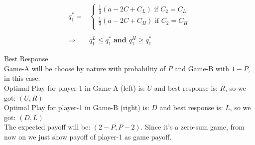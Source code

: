 \documentclass[
  course = {{IE579 Game Theory and Multi-Agent Reinforcement Learning}},
  quartile = {{4}},
  assignment = 2,
  name = {{Mohammad Mahdi Rahimi}},
  studentnumber = {{20208244}},
  email = {{mahi@kaist.ac.kr}},
  firstexercise = 1
]{aga-homework}
\begin{document}
\subexercise
\begin{equation}
    \begin{split}
    q^*_1 = & \begin{cases}
        \frac{1}{3}(a - 2C + C_L) \text{ if } C_2 = C_L\\
        \frac{1}{3}(a - 2C + C_H) \text{ if } C_2 = C_H\\
        \end{cases} \\\\
    \Rightarrow & q^L_1 \le q^*_1 \textbf{ and } q^H_1 \ge q^*_1 
    \end{split}
\end{equation}


\exercise
\subexercise Best Response
\\
Game-A will be choose by nature with probability of $P$ and Game-B with $1 - P$, in this case:\\
Optimal Play for player-1 in Game-A (left) is: $U$ and best response is: $R$, so we got: $(U,R)$\\
Optimal Play for player-1 in Game-B (right) is: $D$ and best response is: $L$, so we got: $(D,L)$\\
The expected payoff will be: $(2 - P, P - 2)$. Since it's a zero-sum game, from now on we just show payoff of player-1 as game payoff.

\subexercise
\\\\
\end{document}
